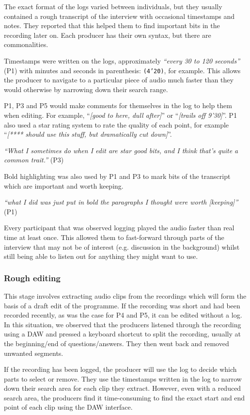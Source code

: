 The exact format of the logs varied between individuals, but they usually contained a rough transcript of the interview
with occasional timestamps and notes. They reported that this helped them to find important bits in the recording later
on. Each producer has their own syntax, but there are commonalities.

Timestamps were written on the logs, approximately \textit{``every 30 to 120 seconds''} (P1) with minutes and seconds
in parenthesis: \texttt{(4'20)}, for example.  This allows the producer to navigate to a particular piece of audio much
faster than they would otherwise by narrowing down their search range.

P1, P3 and P5 would make comments for themselves in the log to help them when editing. For example, ``\textit{[good to
  here, dull after]}'' or ``\textit{[trails off 9'30]}''. P1 also used a star rating system to rate the quality of each
point, for example ``\textit{[**** should use this stuff, but dramatically cut down]}''.

\textit{``What I sometimes do when I edit are star good bits, and I think that's quite a common trait.''} (P3)

Bold highlighting was also used by P1 and P3 to mark bits of the transcript which are important and worth keeping.

\textit{``what I did was just put in bold the paragraphs I thought were worth [keeping]''} (P1)

Every participant that was observed logging played the audio faster than real time at least once. This allowed them to
fast-forward through parts of the interview that may not be of interest (e.g. discussion in the background) whilst
still being able to listen out for anything they might want to use.

\subsubsection{Rough editing}
This stage involves extracting audio clips from the recordings which will form the basis of a draft edit of the
programme. If the recording was short and had been recorded recently, as was the case for P4 and P5, it can be edited
without a log. In this situation, we observed that the producers listened through the recording using a DAW and pressed
a keyboard shortcut to split the recording, usually at the beginning/end of questions/answers. They then went back and
removed unwanted segments.

If the recording has been logged, the producer will use the log to decide which parts to select or remove. They use the
timestamps written in the log to narrow down their search area for each clip they extract. However, even with a reduced
search area, the producers find it time-consuming to find the exact start and end point of each clip using the DAW
interface.

